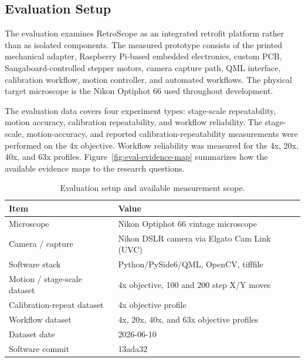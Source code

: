 \subsection{Evaluation Setup}

The evaluation examines RetroScope as an integrated retrofit platform rather than as isolated components. The measured prototype consists of the printed mechanical adapter, Raspberry Pi-based embedded electronics, custom PCB, Sangaboard-controlled stepper motors, camera capture path, QML interface, calibration workflow, motion controller, and automated workflows. The physical target microscope is the Nikon Optiphot 66 used throughout development.

The evaluation data covers four experiment types: stage-scale repeatability, motion accuracy, calibration repeatability, and workflow reliability. The stage-scale, motion-accuracy, and reported calibration-repeatability measurements were performed on the 4x objective. Workflow reliability was measured for the 4x, 20x, 40x, and 63x profiles. Figure~\ref{fig:eval-evidence-map} summarizes how the available evidence maps to the research questions.



\begin{table}[H]
    \centering
    \caption[Evaluation setup]{Evaluation setup and available measurement scope.}
    \label{tab:setup}
    \begin{tabular}{@{}l L{8.2cm}@{}}
        \toprule
        \textbf{Item} & \textbf{Value} \\
        \midrule
        Microscope & Nikon Optiphot 66 vintage microscope \\
        Camera / capture & Nikon DSLR camera via Elgato Cam Link (UVC) \\
        Software stack & Python/PySide6/QML, OpenCV, tifffile \\
        Motion / stage-scale dataset & 4x objective, 100 and 200 step X/Y moves \\
        Calibration-repeat dataset & 4x objective profile \\
        Workflow dataset & 4x, 20x, 40x, and 63x objective profiles \\
        Dataset date & 2026-06-10 \\
        Software commit & 13ada32 \\
        \bottomrule
    \end{tabular}
\end{table}

